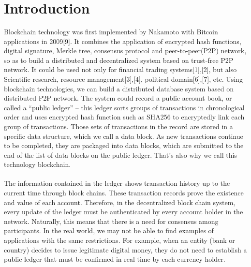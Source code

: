\documentclass[doublespacing]{bmcart}
\begin{document}
\begin{CJK*}{UTF8}{gbsn}
\paragraph{}


\section{Introduction}
\paragraph{}
Blockchain technology was first implemented by Nakamoto with Bitcoin applications in 2009[9]. It combines the application of encrypted hash functions, digital signature, Merkle tree, consensus protocol and peer-to-peer(P2P) network, so as to build a distributed and decentralized system based on trust-free P2P network. It could be used not only for financial trading systems[1],[2], but also Scientific  research,  resource management[3],[4], political domain[6],[7], etc. Using blockchain technologies, we can build a distributed database system based on distributed P2P network. The system could record a public account book, or called a ``public ledger'' – this ledger sorts groups of transactions in chronological order and uses encrypted hash function such as SHA256 to encryptedly link each group of transactions. Those sets of transactions in the record are stored in a specific data structure, which we call a data block. As new transactions continue to be completed, they are packaged into data blocks, which are submitted to the end of the list of data blocks on the public ledger. That's also why we call this technology blockchain.
	\paragraph{}
The information contained in the ledger shows transaction history up to the current time through block chains. These transaction records prove the existence and value of each account. Therefore, in the decentralized block chain system, every update of the ledger must be authenticated by every account holder in the network. Naturally, this means that there is a need for consensus among participants. In the real world, we may not be able to find examples of applications with the same restrictions. For example, when an entity (bank or country) decides to issue legitimate digital money, they do not need to establish a public ledger that must be confirmed in real time by each currency holder.

\end{CJK*}
\end{document}
